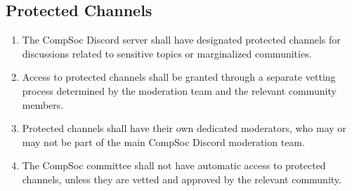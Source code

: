 \subsection{Protected Channels}
\begin{enumerate}
    \item The CompSoc Discord server shall have designated protected channels for discussions related to sensitive topics or marginalized communities.
    \item Access to protected channels shall be granted through a separate vetting process determined by the moderation team and the relevant community members.
    \item Protected channels shall have their own dedicated moderators, who may or may not be part of the main CompSoc Discord moderation team.
    \item The CompSoc committee shall not have automatic access to protected channels, unless they are vetted and approved by the relevant community.
\end{enumerate}